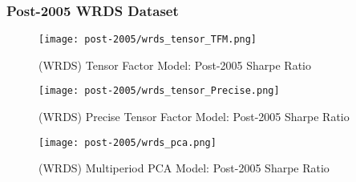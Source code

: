 \subsubsection{Post-2005 WRDS Dataset}

\begin{figure}[H]
    \centering
    \texttt{[image: post-2005/wrds\_tensor\_TFM.png]}
    \caption{(WRDS) Tensor Factor Model: Post-2005 Sharpe Ratio}
    \label{fig:wrds-post-2005-tfm}
\end{figure}

\begin{figure}[H]
    \centering
    \texttt{[image: post-2005/wrds\_tensor\_Precise.png]}
    \caption{(WRDS) Precise Tensor Factor Model: Post-2005 Sharpe Ratio}
    \label{fig:wrds-post-2005-precise}
\end{figure}


\begin{figure}[H]
    \centering
    \texttt{[image: post-2005/wrds\_pca.png]}
    \caption{(WRDS) Multiperiod PCA Model: Post-2005 Sharpe Ratio}
    \label{fig:wrds-post-2005-pca}
\end{figure}
